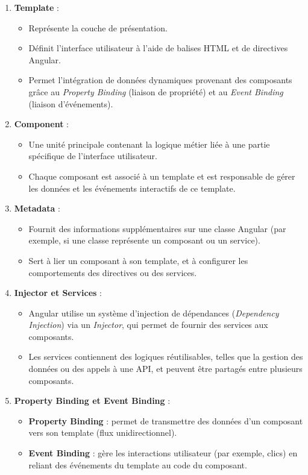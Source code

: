 \begin{enumerate}
    \item \textbf{Template} :
    \begin{itemize}
        \item Représente la couche de présentation.
        \item Définit l’interface utilisateur à l’aide de balises HTML et de directives Angular.
        \item Permet l’intégration de données dynamiques provenant des composants grâce au \textit{Property Binding} (liaison de propriété) et au \textit{Event Binding} (liaison d’événements).
    \end{itemize}

    \item \textbf{Component} :
    \begin{itemize}
        \item Une unité principale contenant la logique métier liée à une partie spécifique de l’interface utilisateur.
        \item Chaque composant est associé à un template et est responsable de gérer les données et les événements interactifs de ce template.
    \end{itemize}

    \item \textbf{Metadata} :
    \begin{itemize}
        \item Fournit des informations supplémentaires sur une classe Angular (par exemple, si une classe représente un composant ou un service).
        \item Sert à lier un composant à son template, et à configurer les comportements des directives ou des services.
    \end{itemize}

    \item \textbf{Injector et Services} :
    \begin{itemize}
        \item Angular utilise un système d’injection de dépendances (\textit{Dependency Injection}) via un \textit{Injector}, qui permet de fournir des services aux composants.
        \item Les services contiennent des logiques réutilisables, telles que la gestion des données ou des appels à une API, et peuvent être partagés entre plusieurs composants.
    \end{itemize}

    \item \textbf{Property Binding et Event Binding} :
    \begin{itemize}
        \item \textbf{Property Binding} : permet de transmettre des données d’un composant vers son template (flux unidirectionnel).
        \item \textbf{Event Binding} : gère les interactions utilisateur (par exemple, clics) en reliant des événements du template au code du composant.
    \end{itemize}


\end{enumerate}
